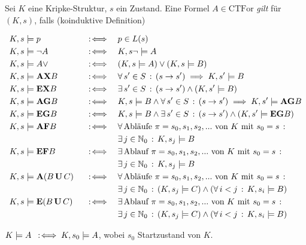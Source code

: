 \documentclass{cheat-sheet}
\newcommand{\CTFor}{\mathrm{CTFor}} %
\newcommand{\U}{\,\mathbf{U}\,} %
\newcommand{\A}{\mathbf{A}}
\newcommand{\E}{\mathbf{E}}
\newcommand{\AG}{\mathbf{AG}}
\newcommand{\EG}{\mathbf{EG}}
\newcommand{\AF}{\mathbf{AF}}
\newcommand{\EF}{\mathbf{EF}}
\newcommand{\AX}{\mathbf{AX}}
\newcommand{\EX}{\mathbf{EX}}
\begin{document}
\begin{defn}
  Sei $K$ eine Kripke-Struktur, $s$ ein Zustand. Eine Formel $A \in \CTFor$ \emph{gilt} für $(K, s)$, falls (koinduktive Definition)

  \begin{alignat*}{3}
    & K, s \models p &&\coloniff&& p \in L(s)\\
    & K, s \models \neg A &&\coloniff&& K, s \neg\models A\\
    & K, s \models A \vee &&\coloniff&& (K, s \models A) \vee (K, s \models B)\\
    & K, s \models \AX B &&\coloniff&& \fa{s' \in S} (s \to s') \implies K, s' \models B\\
    & K, s \models \EX B &&\coloniff&& \ex{s' \in S} (s \to s') \wedge (K, s' \models B)\\
    & K, s \models \AG B &&\coloniff&& K, s \models B \wedge \fa{s' \in S} (s \to s') \implies K, s' \models \AG B\\
    & K, s \models \EG B &&\coloniff&& K, s \models B \wedge \ex{s' \in S} (s \to s') \wedge (K, s' \models \EG B)\\
    & K, s \models \AF B &&\coloniff&& \fa{\text{Abläufe $\pi = s_0, s_1, s_2, ...$ von $K$ mit $s_0 = s$}} \\
      & && && \ex{j \in \N_0} K, s_j \models B \\
    & K, s \models \EF B &&\coloniff&& \ex{\text{Ablauf $\pi = s_0, s_1, s_2, ...$ von $K$ mit $s_0 = s$}} \\
      & && && \ex{j \in \N_0} K, s_j \models B \\
    & K, s \models \A (B \U C) &&\coloniff&& \fa{\text{Abläufe $\pi = s_0, s_1, s_2, ...$ von $K$ mit $s_0 = s$}} \\
    & && && \ex{j \in \N_0} (K, s_j \models C) \wedge (\fa{i < j} K, s_i \models B)\\
    & K, s \models \E (B \U C) &&\coloniff&& \ex{\text{Ablauf $\pi = s_0, s_1, s_2, ...$ von $K$ mit $s_0 = s$}} \\
    & && && \ex{j \in \N_0} (K, s_j \models C) \wedge (\fa{i < j} K, s_i \models B)\\
  \end{alignat*}
\end{defn}

\begin{nota}
  $K \models A \enspace:\!\iff K, s_0 \models A$, wobei $s_0$ Startzustand von $K$.
\end{nota}
\end{document}
